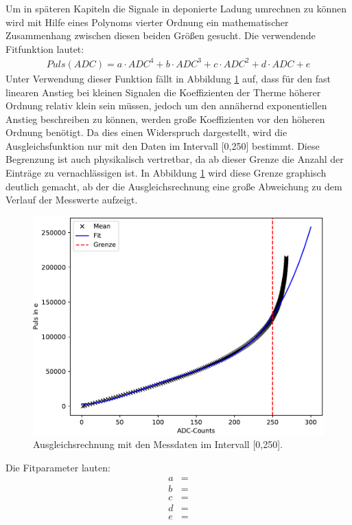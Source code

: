 Um in späteren Kapiteln die Signale in deponierte Ladung umrechnen zu können wird mit Hilfe eines Polynoms vierter Ordnung ein mathematischer Zusammenhang zwischen diesen beiden Größen gesucht.
Die verwendende Fitfunktion lautet:
\begin{align}
	Puls(ADC)=a \cdot ADC^4 + b \cdot ADC^3 + c \cdot ADC^2 + d \cdot ADC + e
\end{align}
Unter Verwendung dieser Funktion fällt in Abbildung \ref{fig:calib_fit} auf, dass für den fast linearen Anstieg bei kleinen Signalen die Koeffizienten der Therme höherer Ordnung relativ klein sein müssen, jedoch um den annähernd exponentiellen Anstieg beschreiben zu können, werden große Koeffizienten vor den höheren Ordnung benötigt. Da dies einen Widerspruch dargestellt, wird die Ausgleichsfunktion nur mit den Daten im Intervall [0,250] bestimmt. Diese Begrenzung ist auch physikalisch vertretbar, da ab dieser Grenze die Anzahl der Einträge zu vernachlässigen ist. In Abbildung \ref{fig:calib_fit} wird diese Grenze graphisch deutlich gemacht, ab der die Ausgleichsrechnung eine große Abweichung zu dem Verlauf der Messwerte aufzeigt.

\begin{figure}[H]
  \centering
  \includegraphics{build/Calib_fit.pdf}
  \caption{Ausgleichsrechnung mit den Messdaten im Intervall [0,250].}
  \label{fig:calib_fit} 
\end{figure}

Die Fitparameter lauten:
\begin{align}
  a &=  \\
  b &=  \\
  c &=  \\
  d &=  \\
  e &= 
\end{align}

